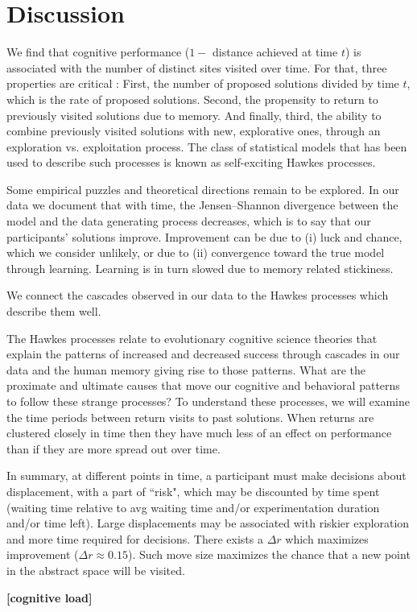 \section{Discussion}
We find that cognitive performance ($1-$ distance achieved at time $t$) is associated with the number of distinct sites visited over time. For that, three properties are critical : First, the number of proposed solutions divided by time $t$, which is the rate of proposed solutions.  Second, the propensity to return to previously visited solutions due to memory. And finally, third, the ability to combine previously visited solutions with new, explorative ones, through an exploration vs. exploitation process.  The class of statistical models that has been used to describe such processes is known as self-exciting Hawkes processes. 

Some empirical puzzles and theoretical directions remain to be explored. 
In our data we document that with time, the Jensen–Shannon divergence between the model and the data generating process decreases, which is to say that our participants' solutions improve.  Improvement can be due to (i) luck and chance, which we consider unlikely, or due to (ii) convergence toward the true model through learning.  Learning is in turn slowed due to memory related stickiness. 
  
We connect the cascades observed in our data to the Hawkes processes which describe them well. 

The Hawkes processes relate to evolutionary cognitive science theories that explain the patterns of increased and decreased success through cascades in our data and the human memory giving rise to those patterns.  What are the proximate and ultimate causes that move our cognitive and behavioral patterns to follow these strange processes? To understand these processes, we will examine the time periods between return visits to past solutions.  When returns are clustered closely in time then they have much less of an effect on performance than if they are more spread out over time.  



In summary, at different points in time, a participant must make decisions about displacement, with a part of ``risk", which may be discounted by time spent (waiting time relative to avg waiting time and/or experimentation duration and/or time left). Large displacements may be associated with riskier exploration and more time required for decisions. There exists a $\Delta r$ which maximizes improvement ($\Delta r \approx 0.15$). Such move size maximizes the chance that a new point in the abstract space will be visited.



{\bf [cognitive load]}









